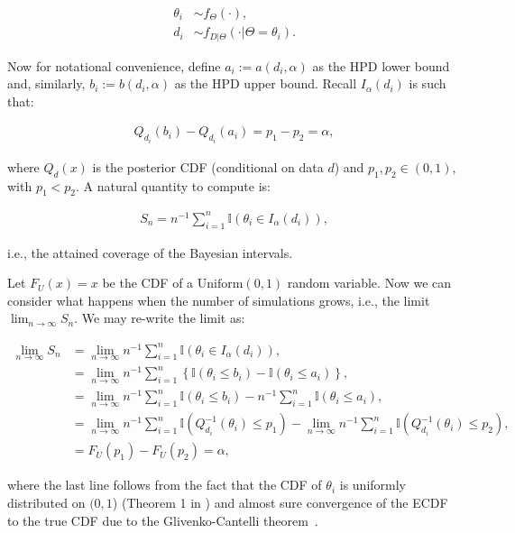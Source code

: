 \documentclass[oneside]{article}
\begin{document}
\begin{align*}
\theta_i & \sim f_\Theta(\cdot), \\
d_i & \sim f_{D|\Theta}(\cdot | \Theta=\theta_i).
\end{align*}

Now for notational convenience, define $a_i := a(d_i, \alpha)$ as the HPD lower bound and, similarly, $b_i := b(d_i, \alpha)$ as the HPD upper bound.
Recall $I_{\alpha}\left(d_i\right)$ is such that:


\begin{align*}
Q_{d_i}\left(b_i\right) - Q_{d_i}\left(a_i\right) = p_1 - p_2 = \alpha,
\end{align*}

\noindent where $Q_{d}(x)$ is the posterior CDF (conditional on data $d$) and $p_1, p_2 \in (0,1)$, with $p_1 < p_2$.
A natural quantity to compute is:

\begin{align*}
S_n = n^{-1}\sum_{i=1}^n \mathbb{I}\left(\theta_i \in I_{\alpha}\left(d_i\right) \right),
\end{align*}

\noindent i.e., the attained coverage of the Bayesian intervals.

Let $F_U(x) = x$ be the CDF of a $\operatorname{Uniform(0, 1)}$ random variable. 
Now we can consider what happens when the number of simulations grows, i.e., the limit $\lim_{n \to \infty} S_n$.
We may re-write the limit as:

\begin{align*}
\lim_{n \to \infty} S_n &= \lim_{n \to \infty} n^{-1}\sum_{i=1}^n \mathbb{I}\left(\theta_i \in I_{\alpha}\left(d_i\right) \right),\\
&=  \lim_{n \to \infty} n^{-1}\sum_{i=1}^n \left\{ \mathbb{I}\left(\theta_i \leq b_i \right) - \mathbb{I}\left(\theta_i \leq a_i \right) \right\},\\
&=  \lim_{n \to \infty} n^{-1}\sum_{i=1}^n \mathbb{I}\left(\theta_i \leq b_i \right) -  n^{-1}\sum_{i=1}^n\mathbb{I}\left(\theta_i \leq a_i \right),\\
&=  \lim_{n \to \infty} n^{-1}\sum_{i=1}^n \mathbb{I}\left(Q_{d_i}^{-1}\left(\theta_i\right) \leq p_1 \right) -   \lim_{n \to \infty} n^{-1}\sum_{i=1}^n\mathbb{I}\left(Q_{d_i}^{-1}\left(\theta_i\right) \leq p_2 \right),\\
&= F_U(p_1) - F_U(p_2) = \alpha,
\end{align*}

\noindent where the last line follows from the fact that the CDF of $\theta_i$ is uniformly distributed on $(0, 1$) (Theorem 1 in \citealp{Cook06}) and almost sure convergence of the ECDF to the true CDF due to the  Glivenko-Cantelli theorem~\cite[page 275]{Billingsley1986}.
\end{document}
